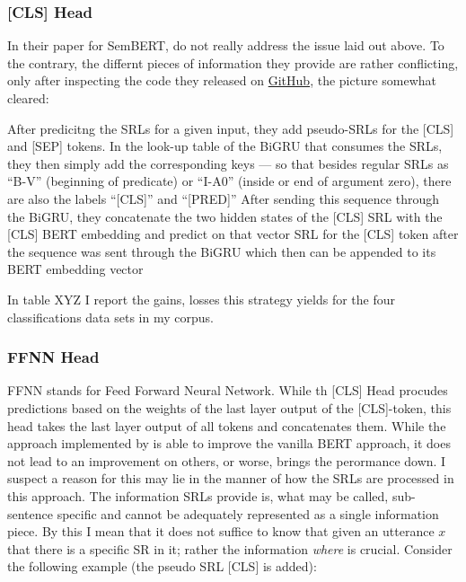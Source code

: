 \subsubsection{[CLS] Head}

In their paper for SemBERT, \cite{zhang2019semantics} do not really address the
issue laid out above. To the contrary, the differnt pieces of information they
provide are rather conflicting, only after inspecting the code they released on
\href{https://github.com/cooelf/SemBERT/}{GitHub}, the picture somewhat cleared:

After predicitng the SRLs for a given input, they add pseudo-SRLs for the [CLS] and [SEP] tokens.
In the look-up table of the BiGRU that consumes the SRLs, they then simply add the corresponding
keys --- so that besides regular SRLs as ``B-V'' (beginning of predicate) or ``I-A0'' (inside
or end of argument zero), there are also the labels ``[CLS]'' and ``[PRED]'' After sending this
sequence through the BiGRU, they concatenate the two hidden states of the [CLS] SRL with the
[CLS] BERT embedding and predict on that vector %
SRL for the [CLS] token after the sequence was sent through the BiGRU which then can be appended
to its BERT embedding vector


In table XYZ I report the gains, losses this strategy yields for the four classifications data sets
in my corpus.

\subsubsection{FFNN Head}

FFNN stands for Feed Forward Neural Network. While th [CLS] Head procudes predictions based on the
weights of the last layer output of the [CLS]-token, this head takes the last layer output of all
tokens and concatenates them.
While the approach implemented by \cite{zhang2019semantics} is able to improve the vanilla
BERT approach, it does not lead to an improvement on others, or worse, brings the perormance
down. I suspect a reason for this may lie in the manner of how the SRLs are processed in this
approach. The information SRLs provide is, what may be called, sub-sentence specific and
cannot be adequately represented as a single information piece. By this I mean that it does
not suffice to know that given an utterance $x$ that there is a specific SR in it; rather the
information \emph{where} is crucial. Consider the following example (the pseudo SRL [CLS] is
added):


